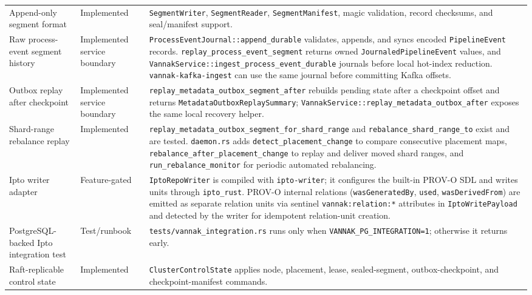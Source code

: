 \begin{longtable}{p{}p{}p{}}
Append-only segment format & Implemented &
\texttt{SegmentWriter}, \texttt{SegmentReader}, \texttt{SegmentManifest}, magic
validation, record checksums, and seal/manifest support. \\

Raw process-event segment history & Implemented service boundary &
\texttt{ProcessEventJournal::append\_durable} validates, appends, and syncs
encoded \texttt{PipelineEvent} records. \texttt{replay\_process\_event\_segment}
returns owned \texttt{JournaledPipelineEvent} values, and
\texttt{VannakService::ingest\_process\_event\_durable} journals before local
hot-index reduction. \texttt{vannak-kafka-ingest} can use the same journal
before committing Kafka offsets. \\

Outbox replay after checkpoint & Implemented service boundary &
\texttt{replay\_metadata\_outbox\_segment\_after} rebuilds pending state after
a checkpoint offset and returns \texttt{MetadataOutboxReplaySummary};
\texttt{VannakService::replay\_metadata\_outbox\_after} exposes the same local
recovery helper. \\

Shard-range rebalance replay & Implemented &
\texttt{replay\_metadata\_outbox\_segment\_for\_shard\_range} and
\texttt{rebalance\_shard\_range\_to} exist and are tested.
\texttt{daemon.rs} adds \texttt{detect\_placement\_change} to compare
consecutive placement maps, \texttt{rebalance\_after\_placement\_change} to
replay and deliver moved shard ranges, and
\texttt{run\_rebalance\_monitor} for periodic automated rebalancing. \\

Ipto writer adapter & Feature-gated &
\texttt{IptoRepoWriter} is compiled with \texttt{ipto-writer}; it configures
the built-in PROV-O SDL and writes units through \texttt{ipto\_rust}. PROV-O
internal relations (\texttt{wasGeneratedBy}, \texttt{used},
\texttt{wasDerivedFrom}) are emitted as separate relation units via sentinel
\texttt{vannak:relation:*} attributes in \texttt{IptoWritePayload} and
detected by the writer for idempotent relation-unit creation. \\

PostgreSQL-backed Ipto integration test & Test/runbook &
\texttt{tests/vannak\_integration.rs} runs only when
\texttt{VANNAK\_PG\_INTEGRATION=1}; otherwise it returns early. \\

Raft-replicable control state & Implemented &
\texttt{ClusterControlState} applies node, placement, lease, sealed-segment,
outbox-checkpoint, and checkpoint-manifest commands. \\


\end{longtable}
